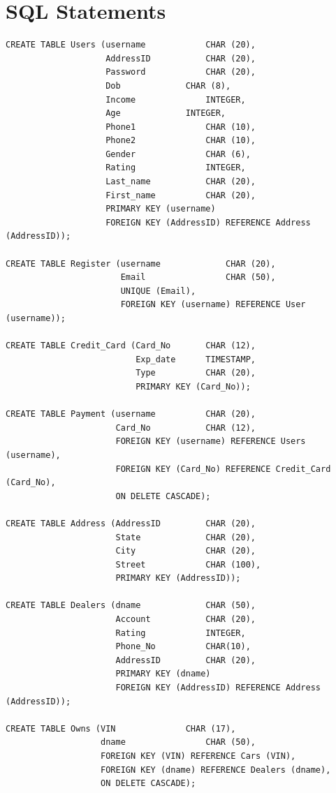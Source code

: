 \documentclass[12pt]{article}
\begin{document}
\section{SQL Statements}
\begin{verbatim}
CREATE TABLE Users (username			CHAR (20),
                    AddressID			CHAR (20),
                    Password			CHAR (20),
                    Dob				CHAR (8),
                    Income				INTEGER,
                    Age				INTEGER,
                    Phone1				CHAR (10),
                    Phone2				CHAR (10),
                    Gender				CHAR (6),
                    Rating				INTEGER,
                    Last_name			CHAR (20),
                    First_name			CHAR (20),
                    PRIMARY KEY (username)
                    FOREIGN KEY (AddressID) REFERENCE Address (AddressID));

CREATE TABLE Register (username				CHAR (20),
                       Email				CHAR (50),
                       UNIQUE (Email),
                       FOREIGN KEY (username) REFERENCE User (username));
                       
CREATE TABLE Credit_Card (Card_No		CHAR (12),
                          Exp_date		TIMESTAMP,
                          Type			CHAR (20),
                          PRIMARY KEY (Card_No));

CREATE TABLE Payment (username			CHAR (20),
                      Card_No			CHAR (12),
                      FOREIGN KEY (username) REFERENCE Users (username),
                      FOREIGN KEY (Card_No) REFERENCE Credit_Card (Card_No),
                      ON DELETE CASCADE);

CREATE TABLE Address (AddressID			CHAR (20),
                      State				CHAR (20),
                      City				CHAR (20),
                      Street			CHAR (100),
                      PRIMARY KEY (AddressID));

CREATE TABLE Dealers (dname				CHAR (50),
                      Account			CHAR (20),
                      Rating			INTEGER,
                      Phone_No			CHAR(10),
                      AddressID			CHAR (20),
                      PRIMARY KEY (dname)
                      FOREIGN KEY (AddressID) REFERENCE Address (AddressID));

CREATE TABLE Owns (VIN				CHAR (17),
                   dname				CHAR (50),
                   FOREIGN KEY (VIN) REFERENCE Cars (VIN),
                   FOREIGN KEY (dname) REFERENCE Dealers (dname),
                   ON DELETE CASCADE);


\end{verbatim}
\end{document}
